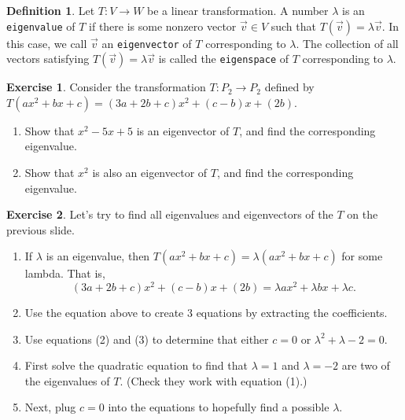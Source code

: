 \documentclass{beamer}
\newcommand{\fn}{\insertframenumber}
\theoremstyle{definition}
\newtheorem{exercise}{Exercise}
\newtheorem*{defn}{Definition}
\renewcommand{\emph}[1]{{\color{blue}\texttt{#1}}}
\begin{document}
\begin{frame}{\fn}
	\begin{defn}
		Let $T:V\to W$ be a  linear transformation.
		A number $\lambda$ is an \emph{eigenvalue} of $T$ if there is some nonzero vector $\vec v\in V$ such that $T(\vec v)=\lambda \vec v$.  In this case, we call $\vec v$ an \emph{eigenvector} of $T$ corresponding to $\lambda$.  The collection of all vectors satisfying $T(\vec v)=\lambda\vec v$ is called the \emph{eigenspace} of $T$ corresponding to $\lambda$.
	\end{defn}
	\begin{exercise}
		Consider the transformation $T:P_2\to P_2$ defined by $T(ax^2+bx+c)=(3a+2b+c)x^2+(c-b)x+(2b)$.  
		\begin{enumerate}[label=(\alph*)]
			\item Show that $x^2-5x+5$ is an eigenvector of $T$, and find the corresponding eigenvalue.
			\item Show that $x^2$ is also an eigenvector of $T$, and find the corresponding eigenvalue.
		\end{enumerate}
	\end{exercise}
\end{frame}
\begin{frame}{\fn}
	\begin{exercise}
		Let's try to find all eigenvalues and eigenvectors of the $T$ on the previous slide.
		\begin{enumerate}[label=(\alph*)]
			\item If $\lambda$ is an eigenvalue, then $T(ax^2+bx+c)=\lambda(ax^2+bx+c)$ for some lambda.  That is,
				\[(3a+2b+c)x^2+(c-b)x+(2b)=\lambda ax^2+\lambda b x+\lambda c.\]
			\item Use the equation above to create 3 equations by extracting the coefficients.\pause
				\only<1-2>{\begin{eqnarray}
				3a+2b+c&=&\lambda a\\
				c-b&=&\lambda b\\
				2b &=&\lambda c
				\end{eqnarray}}
			\item Use equations (2) and (3) to determine that either $c=0$ or $\lambda ^2+\lambda-2=0$.\pause
			\item First solve the quadratic equation to find that $\lambda = 1$ and $\lambda =-2$ are two of the eigenvalues of $T$. (Check they work with equation (1).)
			\item Next, plug $c=0$ into the equations to hopefully find a possible $\lambda$.
		\end{enumerate}
	\end{exercise}
\end{frame}
\end{document}
